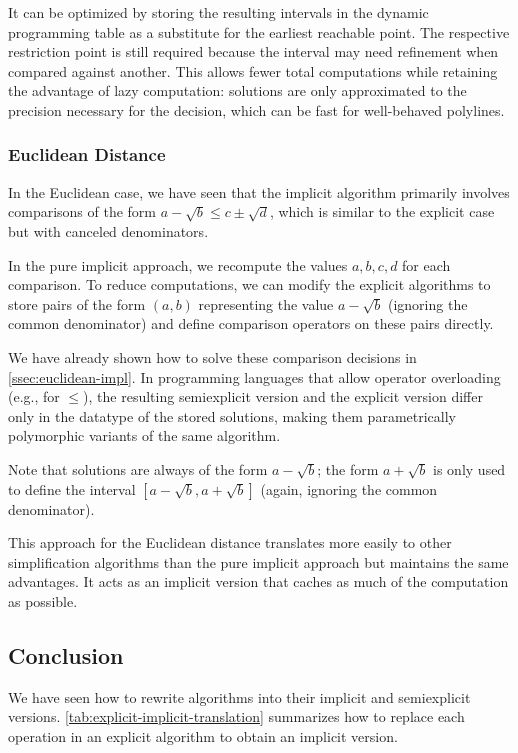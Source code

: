 It can be optimized by storing the resulting intervals in the dynamic programming table as a substitute for the earliest reachable point. The respective restriction point is still required because the interval may need refinement when compared against another. This allows fewer total computations while retaining the advantage of lazy computation: solutions are only approximated to the precision necessary for the decision, which can be fast for well-behaved polylines.

\subsubsection{Euclidean Distance}
In the Euclidean case, we have seen that the implicit algorithm primarily involves comparisons of the form \(a - \sqrt{b} \leq c \pm \sqrt{d}\), which is similar to the explicit case but with canceled denominators.

In the pure implicit approach, we recompute the values \(a, b, c, d\) for each comparison. To reduce computations, we can modify the explicit algorithms to store pairs of the form \((a, b)\) representing the value \(a - \sqrt{b}\) (ignoring the common denominator) and define comparison operators on these pairs directly.

We have already shown how to solve these comparison decisions in \cref{ssec:euclidean-impl}. In programming languages that allow operator overloading (e.g., for \(\leq\)), the resulting semiexplicit version and the explicit version differ only in the datatype of the stored solutions, making them parametrically polymorphic variants of the same algorithm.

Note that solutions are always of the form \(a - \sqrt{b}\); the form \(a + \sqrt{b}\) is only used to define the interval \([a - \sqrt{b}, a + \sqrt{b}]\) (again, ignoring the common denominator).

This approach for the Euclidean distance translates more easily to other simplification algorithms than the pure implicit approach but maintains the same advantages. It acts as an implicit version that caches as much of the computation as possible.

\subsection{Conclusion}
We have seen how to rewrite algorithms into their implicit and semiexplicit versions. \cref{tab:explicit-implicit-translation} summarizes how to replace each operation in an explicit algorithm to obtain an implicit version.

